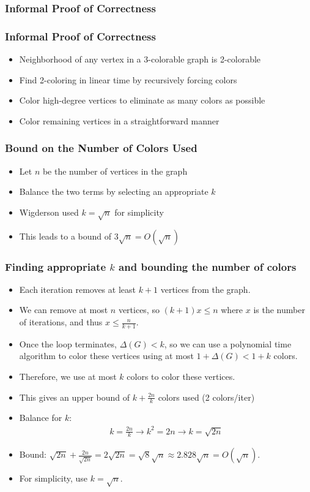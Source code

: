 \documentclass{beamer}
\begin{document}
\subsubsection{Informal Proof of Correctness}
\begin{frame}
\frametitle{Informal Proof of Correctness}
\begin{itemize}
    \item Neighborhood of any vertex in a 3-colorable graph is 2-colorable
    \item Find 2-coloring in linear time by recursively forcing colors
    \item Color high-degree vertices to eliminate as many colors as possible
    \item Color remaining vertices in a straightforward manner
\end{itemize}
\end{frame}

\begin{frame}
\frametitle{Bound on the Number of Colors Used}
\begin{itemize}
    \item Let \(n\) be the number of vertices in the graph
    \item Balance the two terms by selecting an appropriate \(k\)
    \item Wigderson used \(k = \sqrt{n}\) for simplicity
    \item This leads to a bound of \(3\sqrt{n} = O(\sqrt{n})\)
\end{itemize}
\end{frame}

\begin{frame}
\frametitle{Finding appropriate $k$ and bounding the number of colors}
\begin{itemize}
    \item Each iteration removes at least $k + 1$ vertices from the graph.
    \item We can remove at most $n$ vertices, so $(k+1)x \leq n$ where $x$ is the number of iterations, and thus $x \leq \frac{n}{k+1}$.
    \item Once the loop terminates, $\Delta(G) < k$, so we can use a polynomial time algorithm to color these vertices using at most $1 + \Delta(G) < 1 + k$ colors.
    \item Therefore, we use at most $k$ colors to color these vertices.
    \item This gives an upper bound of $k + \frac{2n}{k}$ colors used
      (2 colors/iter)
    \item Balance for $k$:
    \begin{align*}
        k = \frac{2n}{k} \longrightarrow k^2 = 2n \longrightarrow k = \sqrt{2n}
    \end{align*}
    \item Bound:  $\sqrt{2n} + \frac{2n}{\sqrt{2n}} = 2\sqrt{2n} = \sqrt{8}\sqrt{n} \approx 2.828\sqrt{n} = O(\sqrt{n})$.
    \item For simplicity, use $k = \sqrt{n}$.
\end{itemize}
\end{frame}
\end{document}
